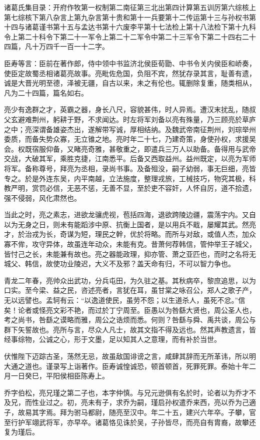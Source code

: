 \documentclass[12pt,UTF8]{ctexbook}
\begin{document}
诸葛氏集目录：开府作牧第一权制第二南征第三北出第四计算第五训厉第六综核上第七综核下第八杂言上第九杂言第十贵和第十一兵要第十二传运第十三与孙权书第十四与诸葛谨书第十五与孟达书第十六废李平第十七法检上第十八法检下第十九科令上第二十科令下第二十一军令上第二十二军令中第二十三军令下第二十四右二十四篇，凡十万四千一百一十二字。

臣寿等言：臣前在著作郎，侍中领中书监济北侯臣荀勖、中书令关内侯臣和峤奏，使臣定故蜀丞相诸葛亮故事。亮毗佐危国，负阻不宾，然犹存录其言，耻善有遗，诚是大晋光明至德，泽被无疆，自古以来，未之有伦也。辄删除复重，随类相从，凡为二十四篇，篇名如右。

亮少有逸群之才，英霸之器，身长八尺，容貌甚伟，时人异焉。遭汉末扰乱，随叔父玄避难荆州，躬耕于野，不求闻达。时左将军刘备以亮有殊量，乃三顾亮於草庐之中；亮深谓备雄姿杰出，遂解带写诚，厚相结纳。及魏武帝南征荆州，刘琮举州委质，而备失势众寡，无立锥之地。亮时年二十七，乃建奇策，身使孙权，求援吴会。权既宿服仰备，又睹亮奇雅，甚敬重之，即遣兵三万人以助备。备得用与武帝交战，大破其军，乘胜克捷，江南悉平。后备又西取益州。益州既定，以亮为军师将军。备称尊号，拜亮为丞相，录尚书事。及备殂没，嗣子幼弱，事无巨细，亮皆专之。於是外连东吴，内平南越，立法施度，整理戎旅，工械技巧，物究其极，科教严明，赏罚必信，无恶不惩，无善不显，至於吏不容奸，人怀自厉，道不拾遗，强不侵弱，风化肃然也。

当此之时，亮之素志，进欲龙骧虎视，苞括四海，退欲跨陵边疆，震荡宇内。又自以为无身之日，则未有能蹈涉中原、抗衡上国者，是以用兵不戢，屡耀其武。然亮才，於治戎为长，奇谋为短，理民之幹，优於将略。而所与对敌，或值人杰，加众寡不侔，攻守异体，故虽连年动众，未能有克。昔萧何荐韩信，管仲举王子城父，皆忖己之长，未能兼有故也。亮之器能政理，抑亦管、萧之亚匹也，而时之名将无城父、韩信，故使功业陵迟，大义不及邪？盖天命有归，不可以智力争也。

青龙二年春，亮帅众出武功，分兵屯田，为久驻之基。其秋病卒，黎庶追思，以为口实。至今梁、益之民，咨述亮者，言犹在耳，虽甘棠之咏召公，郑人之歌子产，无以远譬也。孟轲有云：“以逸道使民，虽劳不怨；以生道杀人，虽死不忿。”信矣！论者或怪亮文彩不艳，而过於丁宁周至。臣愚以为咎繇大贤也，周公圣人也，考之尚书，咎繇之谟略而雅，周公之诰烦而悉。何则？咎繇与舜、禹共谈，周公与群下矢誓故也。亮所与言，尽众人凡士，故其文指不得及远也。然其声教遗言，皆经事综物，公诚之心，形于文墨，足以知其人之意理，而有补於当世。

伏惟陛下迈踪古圣，荡然无忌，故虽敌国诽谤之言，咸肆其辞而无所革讳，所以明大通之道也。谨录写上诣著作。臣寿诚惶诚恐，顿首顿首，死罪死罪。泰始十年二月一日癸巳，平阳侯相臣陈寿上。

乔字伯松，亮兄瑾之第二子也，本字仲慎。与兄元逊俱有名於时，论者以为乔才不及兄，而性业过之。初，亮未有子，求乔为嗣，瑾启孙权遣乔来西，亮以乔为己適子，故易其字焉。拜为驸马都尉，随亮至汉中。年二十五，建兴六年卒。子攀，官至行护军翊武将军，亦早卒。诸葛恪见诛於吴，子孙皆尽，而亮自有胄裔，故攀还复为瑾后。
\end{document}
